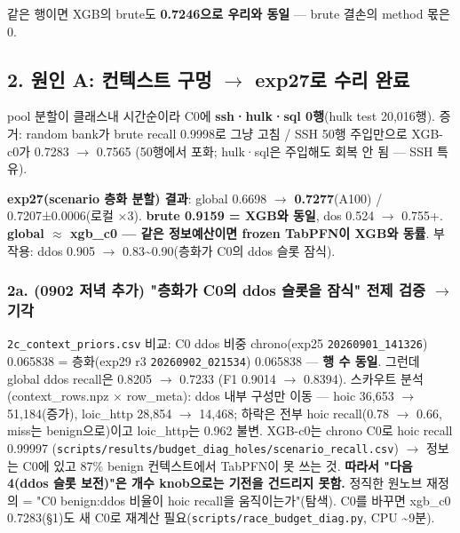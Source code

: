 \par\noindent \textbullet\enspace 같은 행이면 XGB의 brute도 \textbf{0.7246으로 우리와 동일} — brute 결손의 method 몫은 0.


\subsection{2. 원인 A: 컨텍스트 구멍  \ensuremath{\rightarrow}  exp27로 수리 완료}
pool 분할이 클래스내 시간순이라 C0에 \textbf{ssh·hulk·sql 0행}(hulk test 20,016행). 증거: random bank가 brute recall 0.9998로 그냥 고침 /\allowbreak{} SSH 50행 주입만으로 XGB-c0가 0.7283 \ensuremath{\rightarrow} 0.7565 (50행에서 포화; hulk·sql은 주입해도 회복 안 됨 — SSH 특유).

\textbf{exp27(scenario 층화 분할) 결과}: global 0.6698  \ensuremath{\rightarrow}  \textbf{0.7277}(A100) /\allowbreak{} 0.7207±0.0006(로컬 ×3). \textbf{brute 0.9159 =\allowbreak{} XGB와 동일}, dos 0.524 \ensuremath{\rightarrow} 0.755+\allowbreak{}. \textbf{global \ensuremath{\approx} xgb\_\allowbreak{}c0 — 같은 정보예산이면 frozen TabPFN이 XGB와 동률}. 부작용: ddos 0.905 \ensuremath{\rightarrow} 0.83\textasciitilde{}0.90(층화가 C0의 ddos 슬롯 잠식).

\subsubsection{2a. (0902 저녁 추가) "층화가 C0의 ddos 슬롯을 잠식" 전제 검증  \ensuremath{\rightarrow}  기각}
\texttt{2c\_\allowbreak{}\allowbreak{}conte\allowbreak{}xt\_\allowbreak{}\allowbreak{}prior\allowbreak{}s.\allowbreak{}csv} 비교: C0 ddos 비중 chrono(exp25 \texttt{20260901\allowbreak{}\_\allowbreak{}\allowbreak{}141326}) 0.065838 =\allowbreak{} 층화(exp29 r3 \texttt{20260902\allowbreak{}\_\allowbreak{}\allowbreak{}021534}) 0.065838 — \textbf{행 수 동일}. 그런데 global ddos recall은 0.8205  \ensuremath{\rightarrow}  0.7233 (F1 0.9014  \ensuremath{\rightarrow}  0.8394). 스카우트 분석(context\_\allowbreak{}rows.npz × row\_\allowbreak{}meta): ddos 내부 구성만 이동 — hoic 36,653  \ensuremath{\rightarrow}  51,184(증가), loic\_\allowbreak{}http 28,854  \ensuremath{\rightarrow}  14,468; 하락은 전부 hoic recall(0.78  \ensuremath{\rightarrow}  0.66, miss는 benign으로)이고 loic\_\allowbreak{}http는 0.962 불변. XGB-c0는 chrono C0로 hoic recall 0.99997 (\texttt{scripts/\allowbreak{}\allowbreak{}results/\allowbreak{}\allowbreak{}budget\_\allowbreak{}\allowbreak{}d\allowbreak{}iag\_\allowbreak{}\allowbreak{}hole\allowbreak{}s/\allowbreak{}\allowbreak{}scenar\allowbreak{}io\_\allowbreak{}\allowbreak{}recal\allowbreak{}l.\allowbreak{}csv})  \ensuremath{\rightarrow}  정보는 C0에 있고 87\% benign 컨텍스트에서 TabPFN이 못 쓰는 것. \textbf{따라서 "다음 4(ddos 슬롯 보전)"은 개수 knob으로는 기전을 건드리지 못함.} 정직한 원노브 재정의 =\allowbreak{} "C0 benign:ddos 비율이 hoic recall을 움직이는가"(탐색). C0를 바꾸면 xgb\_\allowbreak{}c0 0.7283(§1)도 새 C0로 재계산 필요(\texttt{scripts/\allowbreak{}\allowbreak{}race\_\allowbreak{}\allowbreak{}bud\allowbreak{}get\_\allowbreak{}\allowbreak{}diag\allowbreak{}.\allowbreak{}py}, CPU \textasciitilde{}9분).

